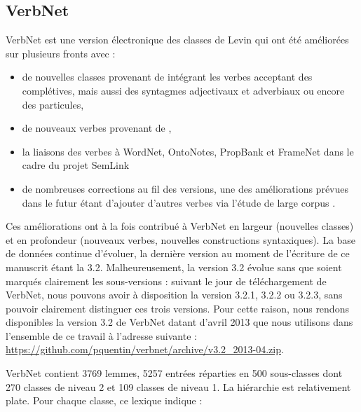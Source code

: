 \subsection{VerbNet}
\label{presentation_verbnet}

VerbNet \citep{kipperschuler2005verbnet} est une version électronique des
classes de Levin qui ont été améliorées sur plusieurs fronts avec :

\begin{itemize}

    \item de nouvelles classes provenant de \cite{korhonen2004extended}
        intégrant les verbes acceptant des complétives, mais aussi des
        syntagmes adjectivaux et adverbiaux ou encore des particules,

    \item de nouveaux verbes provenant de \cite{dorr2001lcs},

    \item la liaisons des verbes à WordNet, OntoNotes, PropBank et FrameNet
        dans le cadre du projet SemLink \citep{palmer2009semlink}

    \item de nombreuses corrections au fil des versions, une des améliorations
        prévues dans le futur étant d'ajouter d'autres verbes via l'étude de
        large corpus \citep{bonial2013expanding}.

\end{itemize}

Ces améliorations ont à la fois contribué à VerbNet en largeur (nouvelles
classes) et en profondeur (nouveaux verbes, nouvelles constructions
syntaxiques). La base de données continue d'évoluer, la dernière version au
moment de l'écriture de ce manuscrit étant la 3.2. Malheureusement, la version
3.2 évolue sans que soient marqués clairement les sous-versions : suivant le
jour de téléchargement de VerbNet, nous pouvons avoir à disposition la version
3.2.1, 3.2.2 ou 3.2.3, sans pouvoir clairement distinguer ces trois versions.
Pour cette raison, nous rendons disponibles la version 3.2 de VerbNet datant
d'avril 2013 que nous utilisons dans l'ensemble de ce travail à l'adresse
suivante : \url{https://github.com/pquentin/verbnet/archive/v3.2_2013-04.zip}.

VerbNet contient 3769 lemmes, 5257 entrées réparties en 500 sous-classes dont
270 classes de niveau 2 et 109 classes de niveau 1. La hiérarchie est
relativement plate. Pour chaque classe, ce lexique indique :

